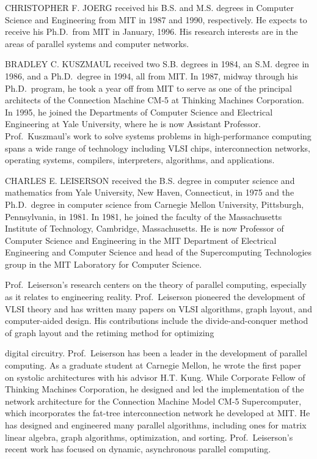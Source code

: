 \documentclass[
]{article}
\begin{document}
CHRISTOPHER F. JOERG received his B.S. and M.S. degrees in Computer
Science and Engineering from MIT in 1987 and 1990, respectively. He
expects to receive his Ph.D.~from MIT in January, 1996. His research
interests are in the areas of parallel systems and computer networks.

BRADLEY C. KUSZMAUL received two S.B. degrees in 1984, an S.M. degree in
1986, and a Ph.D.~degree in 1994, all from MIT. In 1987, midway through
his Ph.D.~program, he took a year off from MIT to serve as one of the
principal architects of the Connection Machine CM-5 at Thinking Machines
Corporation. In 1995, he joined the Departments of Computer Science and
Electrical Engineering at Yale University, where he is now Assistant
Professor. Prof.~Kuszmaul's work to solve systems problems in
high-performance computing spans a wide range of technology including
VLSI chips, interconnection networks, operating systems, compilers,
interpreters, algorithms, and applications.

CHARLES E. LEISERSON received the B.S. degree in computer science and
mathematics from Yale University, New Haven, Connecticut, in 1975 and
the Ph.D.~degree in computer science from Carnegie Mellon University,
Pittsburgh, Pennsylvania, in 1981. In 1981, he joined the faculty of the
Massachusetts Institute of Technology, Cambridge, Massachusetts. He is
now Professor of Computer Science and Engineering in the MIT Department
of Electrical Engineering and Computer Science and head of the
Supercomputing Technologies group in the MIT Laboratory for Computer
Science.

Prof.~Leiserson's research centers on the theory of parallel computing,
especially as it relates to engineering reality. Prof.~Leiserson
pioneered the development of VLSI theory and has written many papers on
VLSI algorithms, graph layout, and computer-aided design. His
contributions include the divide-and-conquer method of graph layout and
the retiming method for optimizing

digital circuitry. Prof.~Leiserson has been a leader in the development
of parallel computing. As a graduate student at Carnegie Mellon, he
wrote the first paper on systolic architectures with his advisor H.T.
Kung. While Corporate Fellow of Thinking Machines Corporation, he
designed and led the implementation of the network architecture for the
Connection Machine Model CM-5 Supercomputer, which incorporates the
fat-tree interconnection network he developed at MIT. He has designed
and engineered many parallel algorithms, including ones for matrix
linear algebra, graph algorithms, optimization, and sorting.
Prof.~Leiserson's recent work has focused on dynamic, asynchronous
parallel computing.
\end{document}

